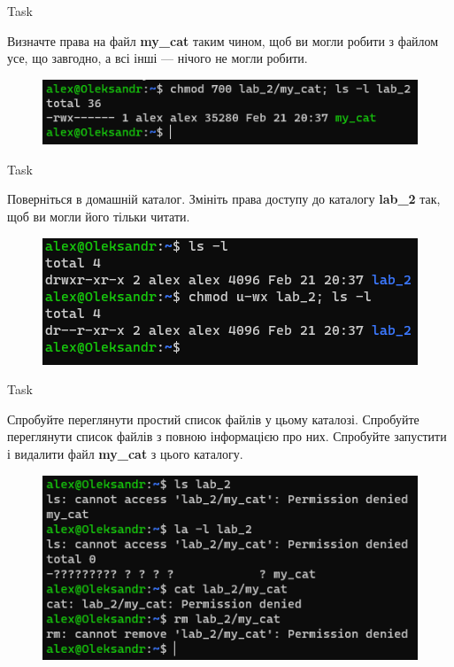 \documentclass[a4paper,12pt]{article}
\newcommand{\RomanNumeralCaps}[1]{\MakeUppercase{\romannumeral #1}}
\begin{document}
    \begin{center}
        \Large{Task \RomanNumeralCaps{7}}
    \end{center}
    Визначте права на файл \textbf{my\_cat} таким чином, щоб ви могли робити з файлом усе, що завгодно, а всі інші — нічого не могли робити.
    \begin{figure}[h!]
        \begin{minipage}[h]{1\linewidth}
            \centering
            \includegraphics[width=0.6\linewidth]{Prt sc/Figure_7.png}  
        \end{minipage}
    \end{figure}

\newpage
    \begin{center}
        \Large{Task \RomanNumeralCaps{8}}
    \end{center}
    Поверніться в домашній каталог. Змініть права доступу до каталогу \textbf{lab\_2} так, щоб ви могли його тільки читати.
    \begin{figure}[h!]
        \begin{minipage}[h]{1\linewidth}
            \centering
            \includegraphics[width=0.6\linewidth]{Prt sc/Figure_8.png}  
        \end{minipage}
    \end{figure}

    \begin{center}
        \Large{Task \RomanNumeralCaps{9}}
    \end{center}
    Спробуйте переглянути простий список файлів у цьому каталозі. Спробуйте переглянути список файлів з повною інформацією про них. Спробуйте запустити і видалити
    файл \textbf{my\_cat} з цього каталогу.
    \begin{figure}[h!]
        \begin{minipage}[h]{1\linewidth}
            \centering
            \includegraphics[width=0.6\linewidth]{Prt sc/Figure_9.png}  
        \end{minipage}
    \end{figure}
\end{document}
